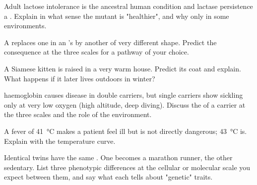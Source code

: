 \begin{exercise}[$\star\star$]\label{exo:g11:enzymes-and-phenotype:9}
Adult lactose intolerance is the ancestral human condition and
lactase persistence a . Explain in what sense the mutant
 is "healthier", and why only in some environments.
\end{exercise}

\begin{exercise}[$\star\star$]\label{exo:g11:enzymes-and-phenotype:10}
A  replaces one  in an 's  by
another of very different shape. Predict the consequence at the three
scales for a pathway of your choice.
\end{exercise}

\begin{exercise}[$\star\star$]\label{exo:g11:enzymes-and-phenotype:11}
A Siamese kitten is raised in a very warm house. Predict its coat and
explain. What happens if it later lives outdoors in winter?
\end{exercise}

\begin{exercise}[$\star\star\star$]\label{exo:g11:enzymes-and-phenotype:12}
 haemoglobin causes disease in double carriers, but single
carriers show sickling only at very low oxygen (high altitude, deep
diving). Discuss the  of a carrier at the three scales and
the role of the environment.
\end{exercise}

\begin{exercise}[$\star\star\star$]\label{exo:g11:enzymes-and-phenotype:13}
A fever of \qty{41}{\celsius} makes a patient feel ill but is not
directly dangerous; \qty{43}{\celsius} is. Explain with the
temperature curve.
\end{exercise}

\begin{exercise}[$\star\star\star$]\label{exo:g11:enzymes-and-phenotype:14}
Identical twins have the same . One becomes a marathon runner,
the other sedentary. List three phenotypic differences at the
cellular or molecular scale you expect between them, and say what each
tells about "genetic" traits.
\end{exercise}

